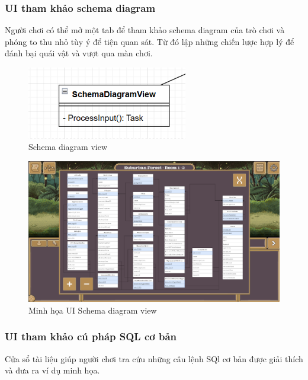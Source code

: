 \subsubsection{UI tham khảo schema diagram}

Người chơi có thể mở một tab để tham khảo schema diagram của trò chơi và phóng to thu nhỏ tùy ý để tiện quan sát. Từ đó lập những chiến lược hợp lý để đánh bại quái vật và vượt qua màn chơi.

\begin{figure}[H]
	\centering
	\includegraphics[width=7cm]{Images/SchemaDiagramView.png}
	\vspace{0.5cm}
	\caption{Schema diagram view}
\end{figure}

\begin{figure}[H]
	\centering
	\includegraphics[width=13cm]{Images/SchemaDiagramUi.png}
	\vspace{0.5cm}
	\caption{Minh họa UI Schema diagram view}
\end{figure}

\subsubsection{UI tham khảo cú pháp SQL cơ bản}

Cửa sổ tài liệu giúp người chơi tra cứu những câu lệnh SQl cơ bản được giải thích và đưa ra ví dụ minh họa.

